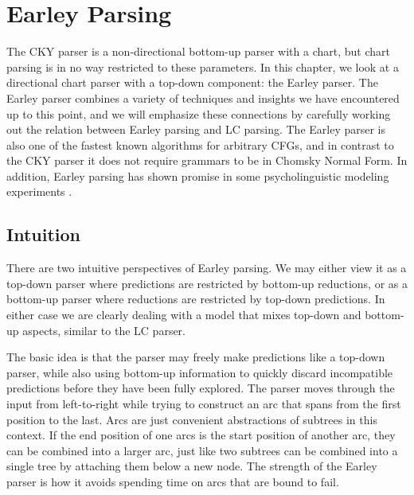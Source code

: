 \chapter{Earley Parsing}
\label{cha:Earley}

The CKY parser is a non-directional bottom-up parser with a chart, but chart parsing is in no way restricted to these parameters.
In this chapter, we look at a directional chart parser with a top-down component: the Earley parser.
The Earley parser combines a variety of techniques and insights we have encountered up to this point, and we will emphasize these connections by carefully working out the relation between Earley parsing and LC parsing.
The Earley parser is also one of the fastest known algorithms for arbitrary CFGs, and in contrast to the CKY parser it does not require grammars to be in Chomsky Normal Form.
In addition, Earley parsing has shown promise in some psycholinguistic modeling experiments \citep{Hale01}.


\section{Intuition}

There are two intuitive perspectives of Earley parsing.
We may either view it as a top-down parser where predictions are restricted by bottom-up reductions, or as a bottom-up parser where reductions are restricted by top-down predictions.
In either case we are clearly dealing with a model that mixes top-down and bottom-up aspects, similar to the LC parser.

The basic idea is that the parser may freely make predictions like a top-down parser, while also using bottom-up information to quickly discard incompatible predictions before they have been fully explored.
The parser moves through the input from left-to-right while trying to construct an arc that spans from the first position to the last.
Arcs are just convenient abstractions of subtrees in this context.
If the end position of one arcs is the start position of another arc, they can be combined into a larger arc, just like two subtrees can be combined into a single tree by attaching them below a new node.
The strength of the Earley parser is how it avoids spending time on arcs that are bound to fail.

